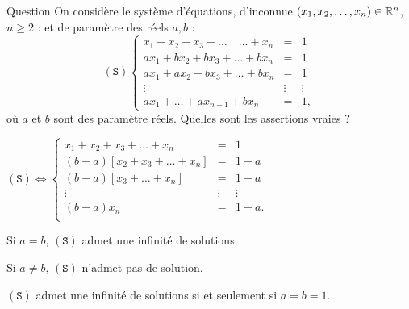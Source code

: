 {Question}
On considère le système d'équations, d'inconnue \((x_1,x_2,\dots,x_n) \in \mathbb{R}^n\), \(n \ge 2\) : et de paramètre des réels  \(a,b\) :
\[(\mathtt{S})  
\left\{\begin{array}{ccc}
x_1+x_2 + x_3+\dots \quad \dots+ x_n&=&1\\
ax_1+bx_2 + bx_3 +  \dots   +bx_n&=&1\\
ax_1+ax_2+bx_3 + \dots +bx_n&=&1\\ \vdots &\vdots&\vdots\\
ax_1+\dots + ax_{n-1}+bx_n&=&1,\end{array}\right.\]
où \(a\) et \(b\) sont des paramètre réels. Quelles sont les assertions vraies ?

    \item* \((\mathtt{S}) \Leftrightarrow
\left\{\begin{array}{rcc}
x_1+x_2+x_3+\dots+ x_n&=&1\\
(b-a)[x_2+x_3+\dots+ x_n]&=&1-a\\
(b-a)[x_3+\dots +x_n]&=&1-a\\
\vdots &\vdots&\vdots\\
(b-a)x_n&=&1-a.\\
\end{array}\right.\)
    \item Si \(a=b\), \((\mathtt{S})\) admet une infinité de solutions.
    \item Si \(a\neq b\), \((\mathtt{S})\) n'admet pas de solution.
    \item* \((\mathtt{S})\) admet une infinité de solutions si et seulement si \(a=b=1\).
\end{multi}


